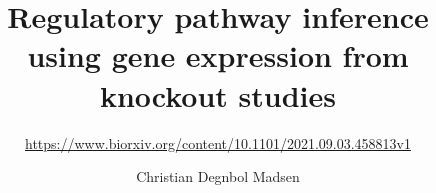 



\title{Regulatory pathway inference using gene expression from knockout studies}
\subtitle{\href{https://www.biorxiv.org/content/10.1101/2021.09.03.458813v1}{https://www.biorxiv.org/content/10.1101/2021.09.03.458813v1}}
\author[Christian Degnbol Madsen]{
\centering
Christian Degnbol Madsen}
\date[August 29, 2019]{
\centering}


\begin{frame}
\maketitle

\end{frame}

